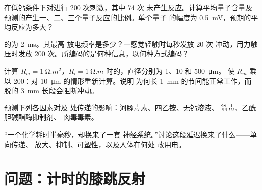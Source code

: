 \begin{exercise}[$\star\star$]\label{exo:b2:neurons-synapses:8}
在低钙条件下对进行 200 次刺激，其中 74 次
未产生反应。计算平均量子含量及
预测的产生一、二、三个量子反应的比例。单个量子
的幅度为 \qty{0.5}{mV}，预期的平均反应为多大？
\end{exercise}

\begin{exercise}[$\star\star$]\label{exo:b2:neurons-synapses:9}
的为 \qty{2}{ms}。其最高
放电频率是多少？一感觉轻触时每秒发放 20 次
冲动，用力触压时发放 200 次。所编码的是何种信息，以何种方式编码？
\end{exercise}

\begin{exercise}[$\star\star\star$]\label{exo:b2:neurons-synapses:10}
计算 $R_m = \qty{1}{\ohm.m^2}$，$R_i =
\qty{1}{\ohm.m}$ 时的，直径分别为 1、10 和 \qty{500}{\micro m}。
使 $R_m$ 乘以 200：对 \qty{10}{\micro m} 的情形重新计算。说明
为何长 \qty{1}{mm} 的节间能正常工作，而
脱的 \qty{3}{mm} 长段会阻断冲动。
\end{exercise}

\begin{exercise}[$\star\star\star$]\label{exo:b2:neurons-synapses:11}
预测下列各因素对及
处传递的影响：河豚毒素、四乙铵、无钙溶液、
箭毒、乙酰胆碱酯酶抑制剂、
肉毒毒素。
\end{exercise}

\begin{exercise}[$\star\star\star$]\label{exo:b2:neurons-synapses:12}
“一个化学耗时半毫秒，却换来了一套
神经系统。”讨论这段延迟换来了什么——单向传递、
放大、抑制、可塑性，以及人体在何处
改用电。
\end{exercise}

\section{问题：计时的膝跳反射}

